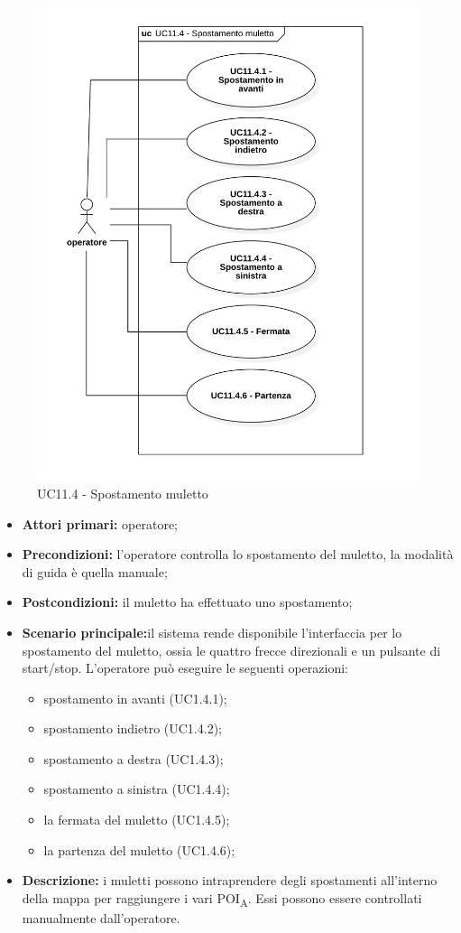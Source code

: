 \begin{figure}[H]
	\centering
	\includegraphics[scale=0.52]{res/images/uc11-4.png}
	\caption{UC11.4 - Spostamento muletto}
\end{figure}

\begin{itemize}
	\item 	\textbf{Attori primari:} operatore;
	\item 	\textbf{Precondizioni:} l'operatore controlla lo spostamento del muletto, la modalità di guida è quella manuale;
	\item 	\textbf{Postcondizioni:} il muletto ha effettuato uno spostamento;
	\item 	\textbf{Scenario principale:}il sistema rende disponibile l'interfaccia per lo spostamento del muletto, ossia le quattro frecce direzionali e un pulsante di start/stop. L'operatore può eseguire le seguenti operazioni:
	\begin{itemize}
		\item spostamento in avanti (UC1.4.1); 
		\item spostamento indietro (UC1.4.2);
		\item spostamento a destra (UC1.4.3);
		\item spostamento a sinistra (UC1.4.4);
		\item la fermata del muletto (UC1.4.5);
		\item la partenza del muletto (UC1.4.6);
	\end{itemize}
	\item 	\textbf{Descrizione:} i muletti possono intraprendere degli spostamenti all'interno della mappa per raggiungere i vari \acrshort{POI}\textsubscript{A}. Essi possono essere controllati manualmente dall'operatore.
\end{itemize}


